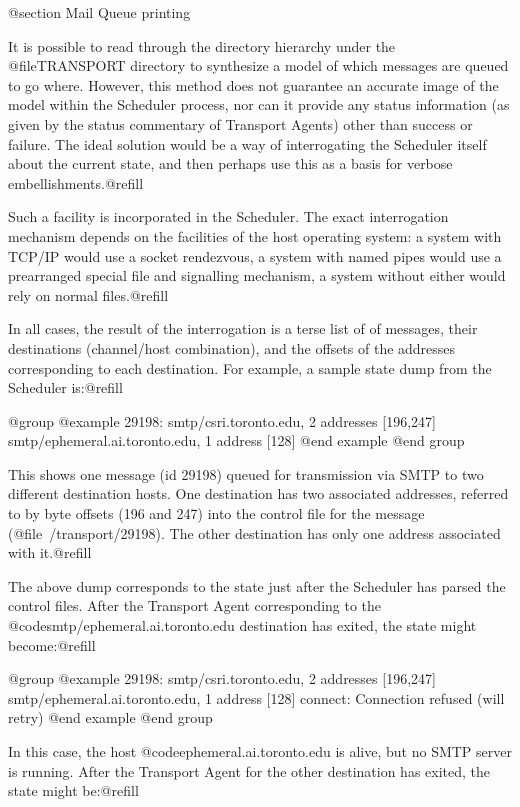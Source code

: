 {{@section Mail Queue printing

It is possible to read through the directory hierarchy under
the @file{TRANSPORT} directory to synthesize a model of which messages
are queued to go where.  However, this method does not guarantee an accurate
image of the model within the Scheduler process, nor can it provide any
status information (as given by the status commentary of Transport Agents)
other than success or failure.  The ideal solution would be a way of
interrogating the Scheduler itself about the current state, and then perhaps
use this as a basis for verbose embellishments.@refill

Such a facility is incorporated in the Scheduler.  The exact interrogation
mechanism depends on the facilities of the host operating system: a system
with TCP/IP would use a socket rendezvous, a system with named pipes would
use a prearranged special file and signalling mechanism, a system without
either would rely on normal files.@refill

In all cases, the result of the interrogation is a terse list of of messages,
their destinations (channel/host combination), and the offsets of
the addresses corresponding to each destination.  For example, a sample
state dump from the Scheduler is:@refill

@group
@example
29198:  smtp/csri.toronto.edu, 2 addresses [196,247]
        smtp/ephemeral.ai.toronto.edu, 1 address [128]
@end example
@end group

This shows one message (id 29198) queued for transmission via SMTP to two
different destination hosts.  One destination has two associated addresses,
referred to by byte offsets (196 and 247) into the control file for the
message (@file{~/transport/29198}).  The other destination has only one
address associated with it.@refill

The above dump corresponds to the state just after the Scheduler has parsed
the control files.  After the Transport Agent corresponding to the
@code{smtp/ephemeral.ai.toronto.edu} destination has exited, the state might
become:@refill

@group
@example
29198:  smtp/csri.toronto.edu, 2 addresses [196,247]
        smtp/ephemeral.ai.toronto.edu, 1 address [128]
                connect: Connection refused (will retry)
@end example
@end group

In this case, the host @code{ephemeral.ai.toronto.edu} is alive, but no
SMTP server is running.  After the Transport Agent for the other destination
has exited, the state might be:@refill

}}
